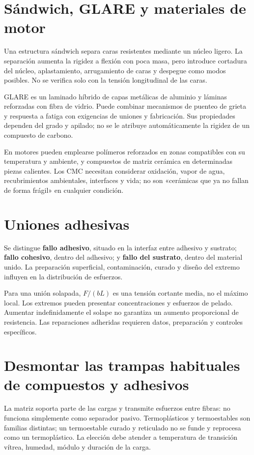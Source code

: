 \section{Sándwich, GLARE y materiales de motor}
Una estructura sándwich separa caras resistentes mediante un núcleo ligero. La separación aumenta la rigidez a flexión con poca masa, pero introduce cortadura del núcleo, aplastamiento, arrugamiento de caras y despegue como modos posibles. No se verifica solo con la tensión longitudinal de las caras.

GLARE es un laminado híbrido de capas metálicas de aluminio y láminas reforzadas con fibra de vidrio. Puede combinar mecanismos de puenteo de grieta y respuesta a fatiga con exigencias de uniones y fabricación. Sus propiedades dependen del grado y apilado; no se le atribuye automáticamente la rigidez de un compuesto de carbono.

En motores pueden emplearse polímeros reforzados en zonas compatibles con su temperatura y ambiente, y compuestos de matriz cerámica en determinadas piezas calientes. Los CMC necesitan considerar oxidación, vapor de agua, recubrimientos ambientales, interfaces y vida; no son «cerámicas que ya no fallan de forma frágil» en cualquier condición.
\section{Uniones adhesivas}
Se distingue \textbf{fallo adhesivo}, situado en la interfaz entre adhesivo y sustrato; \textbf{fallo cohesivo}, dentro del adhesivo; y \textbf{fallo del sustrato}, dentro del material unido. La preparación superficial, contaminación, curado y diseño del extremo influyen en la distribución de esfuerzos.

Para una unión solapada, $F/(bL)$ es una tensión cortante media, no el máximo local. Los extremos pueden presentar concentraciones y esfuerzos de pelado. Aumentar indefinidamente el solape no garantiza un aumento proporcional de resistencia. Las reparaciones adheridas requieren datos, preparación y controles específicos.
\section{Desmontar las trampas habituales de compuestos y adhesivos}
La matriz soporta parte de las cargas y transmite esfuerzos entre fibras: no funciona simplemente como separador pasivo. Termoplásticos y termoestables son familias distintas; un termoestable curado y reticulado no se funde y reprocesa como un termoplástico. La elección debe atender a temperatura de transición vítrea, humedad, módulo y duración de la carga.

